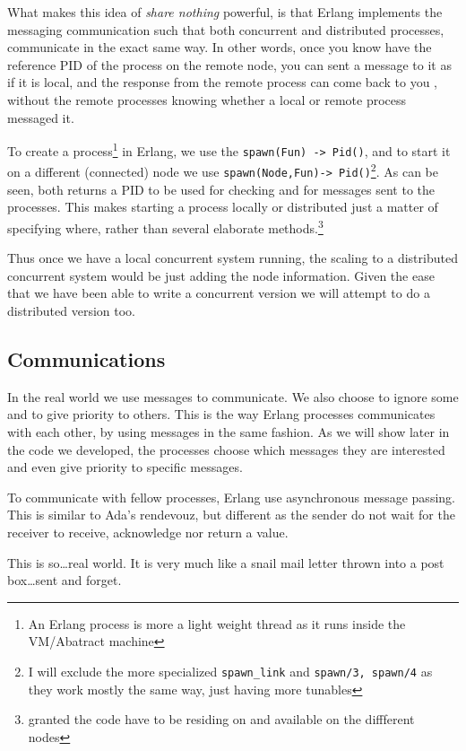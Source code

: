 \documentclass[a4paper,11pt]{report}
\begin{document}
What makes this idea of \emph{share nothing} powerful, is that Erlang
implements the messaging communication such that both concurrent
and distributed processes, communicate in the exact same way. In other
words, once you know have the reference PID of the process on the
remote node, you can sent a message to it as if it is local, and the
response from the remote process can come back to you , without the
remote processes knowing whether a local or remote process messaged
it.

To create a process\footnote{An Erlang process is more a light weight
  thread as it runs inside the VM/Abatract machine} in Erlang, we use
the \texttt{spawn(Fun) -> Pid()}, and to start it on a different
(connected) node we use \texttt{spawn(Node,Fun)-> Pid()}\footnote{I
  will exclude the more specialized \texttt{spawn\_link} and
  \texttt{spawn/3, spawn/4} as they work mostly the same way, just
  having more tunables}. As can be seen, both returns a PID to be used
for checking and for messages sent to the processes. This makes
starting a process locally or distributed just a matter of specifying
where, rather than several elaborate methods.\footnote{granted the
  code have to be residing on and available on the diffferent nodes}

Thus once we have a local concurrent system running, the scaling to a
distributed concurrent system would be just adding the node
information. Given the ease that we have been able to write a
concurrent version we will attempt to do a distributed version too.

\subsection{Communications}
\label{sec:communications}

In the real world we use messages to communicate. We also choose to
ignore some and to give priority to others. This is the way Erlang
processes communicates with each other, by using messages in the same
fashion. As we will show later in the code we developed, the processes
choose which messages they are interested and even give priority to
specific messages.

To communicate with fellow processes, Erlang use asynchronous message
passing. This is similar to Ada's rendevouz, but different as the
sender do not wait for the receiver to receive, acknowledge nor return
a value.

 This is so\ldots real world. It is very much like a
snail mail letter thrown into a post box\ldots sent and forget.
\end{document}
